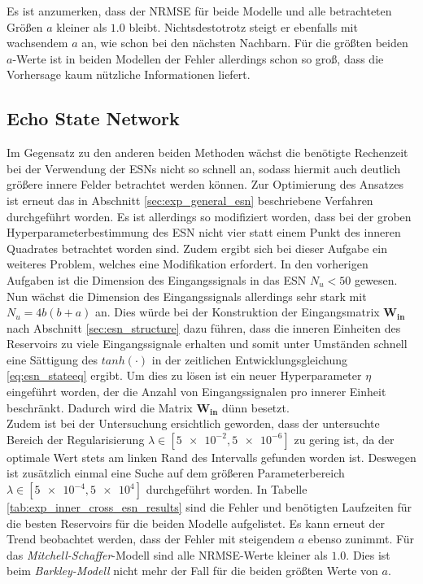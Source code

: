 Es ist anzumerken, dass der NRMSE für beide Modelle und alle betrachteten Größen $a$ kleiner als $1.0$ bleibt. Nichtsdestotrotz steigt er ebenfalls mit wachsendem $a$ an, wie schon bei den nächsten Nachbarn. Für die größten beiden $a$-Werte ist in beiden Modellen der Fehler allerdings schon so groß, dass die Vorhersage kaum nützliche Informationen liefert.

\FloatBarrier
\subsection{Echo State Network}
Im Gegensatz zu den anderen beiden Methoden wächst die benötigte Rechenzeit bei der Verwendung der \textsc{ESN}s nicht so schnell an, sodass hiermit auch deutlich größere innere Felder betrachtet werden können. Zur Optimierung des Ansatzes ist erneut das in Abschnitt \ref{sec:exp_general_esn} beschriebene Verfahren durchgeführt worden. Es ist allerdings so modifiziert worden, dass bei der groben Hyperparameterbestimmung des \textsc{ESN} nicht vier statt einem Punkt des inneren Quadrates betrachtet worden sind. Zudem ergibt sich bei dieser Aufgabe ein weiteres Problem, welches eine Modifikation erfordert. In den vorherigen Aufgaben ist die Dimension des Eingangssignals in das \textsc{ESN} $N_u < 50$ gewesen. Nun wächst die Dimension des Eingangssignals allerdings sehr stark mit $N_u = 4b(b+a)$ an. Dies würde bei der Konstruktion der Eingangsmatrix $\mathbf{W_{in}}$ nach Abschnitt \ref{sec:esn_structure} dazu führen, dass die inneren Einheiten des Reservoirs zu viele Eingangssignale erhalten und somit unter Umständen schnell eine Sättigung des $tanh(\cdot)$ in der zeitlichen Entwicklungsgleichung \ref{eq:esn_stateeq} ergibt. Um dies zu lösen ist ein neuer Hyperparameter $\eta$ eingeführt worden, der die Anzahl von Eingangssignalen pro innerer Einheit beschränkt. Dadurch wird die Matrix $\mathbf{W_{in}}$ dünn besetzt.\\
Zudem ist bei der Untersuchung ersichtlich geworden, dass der untersuchte Bereich der Regularisierung $\lambda \in [\num{5e-2},\num{5e-6}]$ zu gering ist, da der optimale Wert stets am linken Rand des Intervalls gefunden worden ist. Deswegen ist zusätzlich einmal eine Suche auf dem größeren Parameterbereich $\lambda \in [\num{5e-4},\num{5e+4}]$ durchgeführt worden.
In Tabelle \ref{tab:exp_inner_cross_esn_results} sind die Fehler und benötigten Laufzeiten für die besten Reservoirs für die beiden Modelle aufgelistet. Es kann erneut der Trend beobachtet werden, dass der Fehler mit steigendem $a$ ebenso zunimmt. Für das \textit{Mitchell-Schaffer}-Modell sind alle NRMSE-Werte kleiner als $1.0$. Dies ist beim \textit{Barkley-Modell} nicht mehr der Fall für die beiden größten Werte von $a$. 

